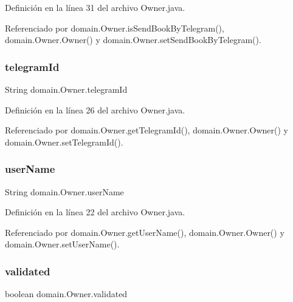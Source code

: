 Definición en la línea 31 del archivo Owner.\+java.



Referenciado por domain.\+Owner.\+is\+Send\+Book\+By\+Telegram(), domain.\+Owner.\+Owner() y domain.\+Owner.\+set\+Send\+Book\+By\+Telegram().

\mbox{\label{classdomain_1_1_owner_a7df022fa9c33f9661d4eac42d113585c}} 
\subsubsection{\texorpdfstring{telegramId}{telegramId}}
{\footnotesize\ttfamily String domain.\+Owner.\+telegram\+Id\hspace{0.3cm}{\ttfamily [private]}}



Definición en la línea 26 del archivo Owner.\+java.



Referenciado por domain.\+Owner.\+get\+Telegram\+Id(), domain.\+Owner.\+Owner() y domain.\+Owner.\+set\+Telegram\+Id().

\mbox{\label{classdomain_1_1_owner_aa8031c9e66a0cbd90d84dc6df66a25a3}} 
\subsubsection{\texorpdfstring{userName}{userName}}
{\footnotesize\ttfamily String domain.\+Owner.\+user\+Name\hspace{0.3cm}{\ttfamily [private]}}



Definición en la línea 22 del archivo Owner.\+java.



Referenciado por domain.\+Owner.\+get\+User\+Name(), domain.\+Owner.\+Owner() y domain.\+Owner.\+set\+User\+Name().

\mbox{\label{classdomain_1_1_owner_adec75a99c7addadf2226be54e9255ca8}} 
\subsubsection{\texorpdfstring{validated}{validated}}
{\footnotesize\ttfamily boolean domain.\+Owner.\+validated\hspace{0.3cm}{\ttfamily [private]}}



